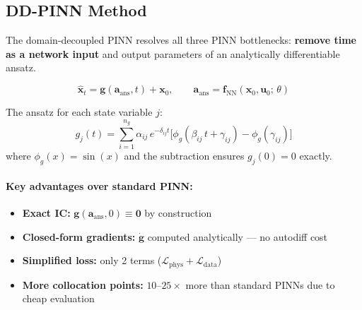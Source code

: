 \documentclass[11pt]{article}
\newcommand{\xhat}{\hat{\mathbf{x}}}
\newcommand{\avec}{\mathbf{a}_{\mathrm{ans}}}
\newcommand{\fnn}{\mathbf{f}_{\mathrm{NN}}}
\newcommand{\phig}{\phi_g}
\begin{document}
\subsection{DD-PINN Method}
\label{sec:pinn:ddpinn}

The domain-decoupled PINN \citep{Krauss2024,Licher2025} resolves all three PINN bottlenecks: \textbf{remove time as a network input} and output parameters of an analytically differentiable ansatz.

\begin{equation}
  \boxed{\xhat_t = \mathbf{g}(\avec, t) + \mathbf{x}_0, \qquad \avec = \fnn(\mathbf{x}_0, \mathbf{u}_0;\, \theta)}
  \label{eq:pinn:ddpinn-core}
\end{equation}

The ansatz for each state variable $j$:
\begin{equation}
  g_j(t) = \sum_{i=1}^{n_g} \alpha_{ij}\, e^{-\delta_{ij} t}
    \bigl[\phig(\beta_{ij}\, t + \gamma_{ij}) - \phig(\gamma_{ij})\bigr]
  \label{eq:pinn:ansatz}
\end{equation}
where $\phig(x) = \sin(x)$ and the subtraction ensures $g_j(0) = 0$ exactly.

\paragraph{Key advantages over standard PINN:}
\begin{itemize}
  \item \textbf{Exact IC:} $\mathbf{g}(\avec, 0) \equiv \mathbf{0}$ by construction
  \item \textbf{Closed-form gradients:} $\dot{\mathbf{g}}$ computed analytically --- no autodiff cost
  \item \textbf{Simplified loss:} only 2 terms ($\mathcal{L}_{\mathrm{phys}} + \mathcal{L}_{\mathrm{data}}$)
  \item \textbf{More collocation points:} $10$--$25\times$ more than standard PINNs due to cheap evaluation
\end{itemize}
\end{document}
